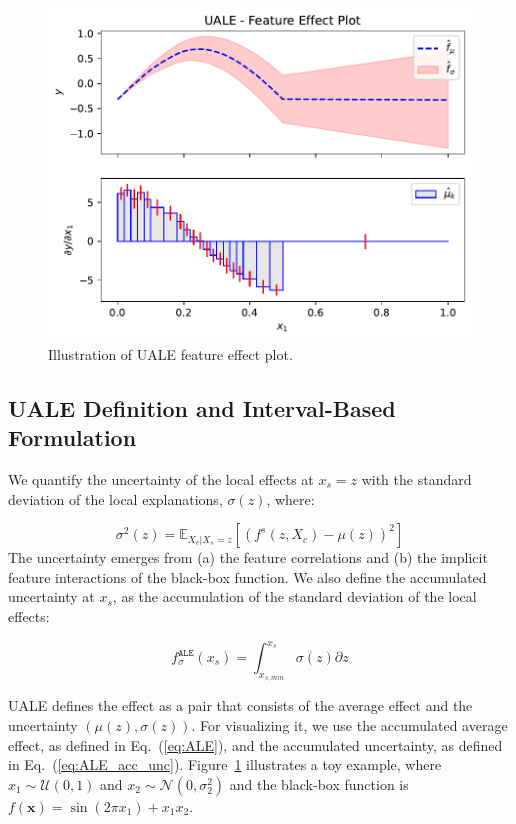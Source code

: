 \documentclass[twoside]{article}
\newcommand{\dfdx}{f^s}
\newcommand{\xb}{\mathbf{x}}
\begin{document}
\begin{figure}
  \centering
  \includegraphics[width=.5\textwidth]{concept_figure/fig-1.pdf}
  \caption{Illustration of UALE feature effect plot.}
  \label{fig:UALE-figure}
\end{figure}

\subsection{UALE Definition and Interval-Based Formulation}
\label{sec:UALE-definition-1}

We quantify the uncertainty of the local effects at \(x_s=z\) with the
standard deviation of the local explanations, \(\sigma(z)\), where:

\begin{equation}
  \label{eq:ALE_var}
  \sigma^2(z) = \mathbb{E}_{X_c|X_s=z}\left [ \left (\dfdx (z, X_c) - \mu(z) \right )^2 \right ] 
\end{equation}
\noindent
The uncertainty emerges from (a) the feature correlations and (b) the
implicit feature interactions of the black-box function. We also
define the accumulated uncertainty at \(x_s\), as the accumulation of
the standard deviation of the local effects:

\begin{equation}
  \label{eq:ALE_acc_unc}
  f^{\mathtt{ALE}}_{\sigma}(x_s) = \int_{x_{s, min}}^{x_s} \sigma(z) \partial z
\end{equation}
\noindent

UALE defines the effect as a pair that consists of the average effect
and the uncertainty \((\mu(z), \sigma(z))\). For visualizing it, we
use the accumulated average effect, as defined in Eq.~(\ref{eq:ALE}),
and the accumulated uncertainty, as defined in
Eq.~(\ref{eq:ALE_acc_unc}). Figure~\ref{fig:UALE-figure} illustrates a
toy example, where \(x_1 \sim \mathcal{U}(0,1)\) and
\(x_2 \sim \mathcal{N}(0,\sigma^2_2)\) and the black-box function is
\(f(\xb)= \sin(2 \pi x_1) + x_1x_2\). 
\end{document}
